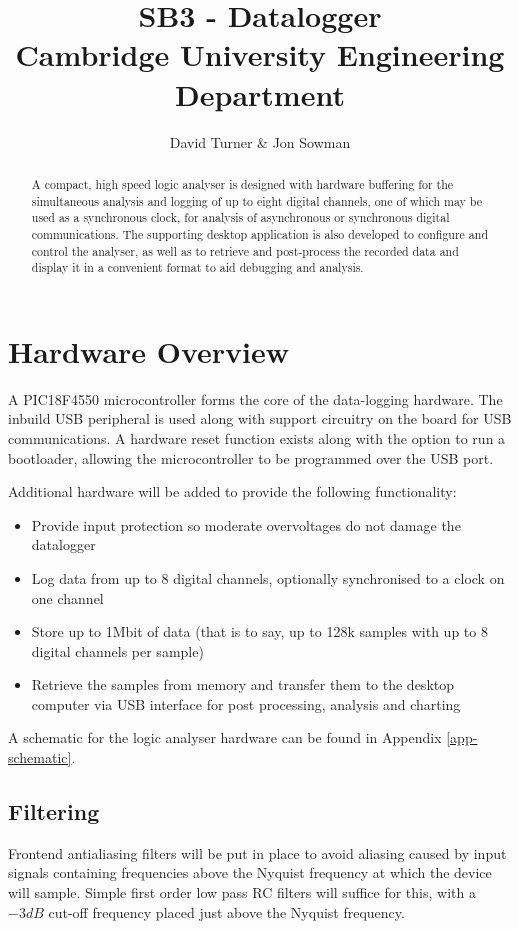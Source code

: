 \documentclass[11pt]{article}
\title{SB3 - Datalogger\\Cambridge University Engineering Department}
\author{David Turner \& Jon Sowman}
\begin{document}
    \maketitle
	
\begin{abstract}
    A compact, high speed logic analyser is designed with hardware buffering for the simultaneous analysis and logging of up to eight digital channels, one of which may be used as a synchronous clock, for analysis of asynchronous or synchronous digital communications. The supporting desktop application is also developed to configure and control the analyser, as well as to retrieve and post-process the recorded data and display it in a convenient format to aid debugging and analysis.
\end{abstract}

\section{Hardware Overview}
    A PIC18F4550 microcontroller forms the core of the data-logging hardware. The inbuild USB peripheral is used along with support circuitry on the board for USB communications. A hardware reset function exists along with the option to run a bootloader, allowing the microcontroller to be programmed over the USB port.

    Additional hardware will be added to provide the following functionality:
    \begin{itemize}
    \item Provide input protection so moderate overvoltages do not damage the datalogger
    \item Log data from up to 8 digital channels, optionally synchronised to a clock on one channel
    \item Store up to 1Mbit of data (that is to say, up to 128k samples with up to 8 digital channels per sample)
    \item Retrieve the samples from memory and transfer them to the desktop computer via USB interface for post processing, analysis and charting
    \end{itemize}

    A schematic for the logic analyser hardware can be found in Appendix
    \ref{app-schematic}.

\subsection{Filtering}
    Frontend antialiasing filters will be put in place to avoid aliasing caused by input signals containing frequencies above the Nyquist frequency at which the device will sample. Simple first order low pass RC filters will suffice for this, with a $-3dB$ cut-off frequency placed just above the Nyquist frequency.
\end{document}
